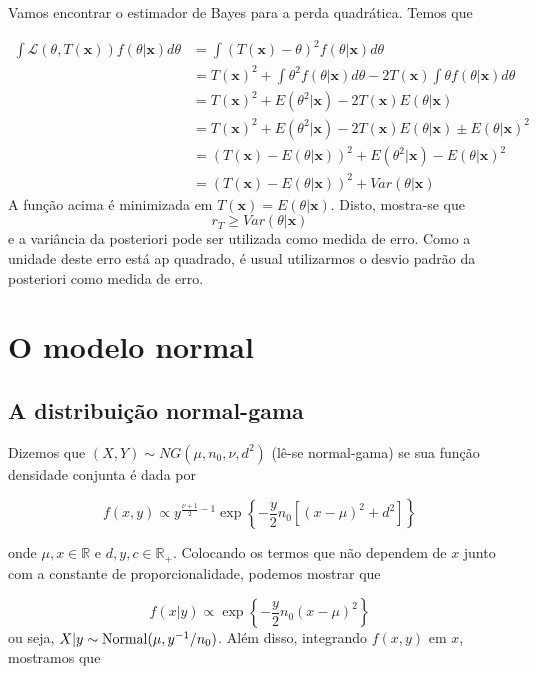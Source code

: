 \documentclass[
  letterpaper,
  DIV=11,
  numbers=noendperiod]{scrreprt}
\theoremstyle{definition}
\theoremstyle{definition}
\theoremstyle{remark}
\begin{document}
Vamos encontrar o estimador de Bayes para a perda quadrática. Temos que

\[\begin{align*}\int \mathcal{L}(\theta,T(\mathbf{x}))f(\theta|\mathbf{x})d\theta&=\int (T(\mathbf{x})-\theta)^2f(\theta|\mathbf{x})d\theta\\
    &=T(\mathbf{x})^2 +\int \theta^2f(\theta|\mathbf{x})d\theta-2T(\mathbf{x})\int \theta f(\theta|\mathbf{x})d\theta\\
    &= T(\mathbf{x})^2 + E(\theta^2|\mathbf{x}) -2T(\mathbf{x})E(\theta|\mathbf{x})\\
    &= T(\mathbf{x})^2 + E(\theta^2|\mathbf{x}) -2T(\mathbf{x})E(\theta|\mathbf{x}) \pm E(\theta|\mathbf{x})^2\\
    &=\left( T(\mathbf{x}) - E(\theta|\mathbf{x})\right)^2 +E(\theta^2|\mathbf{x})-E(\theta|\mathbf{x})^2\\
    &=\left( T(\mathbf{x}) - E(\theta|\mathbf{x})\right)^2 +Var(\theta|\mathbf{x})
\end{align*}\] A função acima é minimizada em
\(T(\mathbf{x})=E(\theta|\mathbf{x})\). Disto, mostra-se que
\[r_T\geq Var(\theta|\mathbf{x})\] e a variância da posteriori pode ser
utilizada como medida de erro. Como a unidade deste erro está ap
quadrado, é usual utilizarmos o desvio padrão da posteriori como medida
de erro.


\hypertarget{o-modelo-normal}{%
\chapter{O modelo normal}\label{o-modelo-normal}}

\hypertarget{a-distribuiuxe7uxe3o-normal-gama}{%
\section{A distribuição
normal-gama}\label{a-distribuiuxe7uxe3o-normal-gama}}

Dizemos que \((X,Y)\sim NG(\mu,n_0,\nu,d^2)\) (lê-se normal-gama) se sua
função densidade conjunta é dada por

\[f(x,y)\propto y^{\frac{\nu+1}{2}-1}\exp\left\{-\frac{y}{2}n_0\left[(x-\mu)^2 + d^2\right]\right\}\]

onde \(\mu,x\in\mathbb{R}\) e \(d,y,c\in\mathbb{R}_+\). Colocando os
termos que não dependem de \(x\) junto com a constante de
proporcionalidade, podemos mostrar que

\[f(x|y)\propto \exp\left\{-\frac{y}{2}n_0(x-\mu)^2\right\}\] ou seja,
\(X|y\sim\hbox{Normal}(\mu,y^{-1}/n_0)\). Além disso, integrando
\(f(x,y)\) em \(x\), mostramos que
\end{document}
